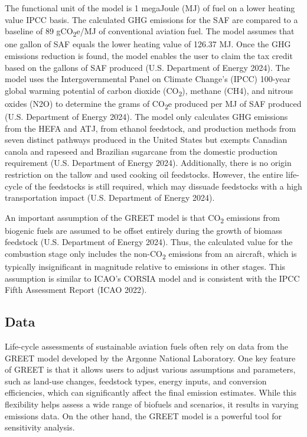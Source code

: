 \documentclass[12pt]{article}
\begin{document}
The functional unit of the model is 1 megaJoule (MJ) of fuel on a lower heating value IPCC basis. The calculated GHG emissions for the SAF are compared to a baseline of 89 gCO\textsubscript{2}e/MJ of conventional aviation fuel. The model assumes that one gallon of SAF equals the lower heating value of 126.37 MJ. Once the GHG emissions reduction is found, the model enables the user to claim the tax credit based on the gallons of SAF produced (U.S. Department of Energy 2024). The model uses the Intergovernmental Panel on Climate Change’s (IPCC) 100-year global warming potential of carbon dioxide (CO\textsubscript{2}), methane (CH4), and nitrous oxides (N2O) to determine the grams of CO\textsubscript{2}e produced per MJ of SAF produced (U.S. Department of Energy 2024). The model only calculates GHG emissions from the HEFA and ATJ, from ethanol feedstock, and production methods from seven distinct pathways produced in the United States but exempts Canadian canola and rapeseed and Brazilian sugarcane from the domestic production requirement (U.S. Department of Energy 2024). Additionally, there is no origin restriction on the tallow and used cooking oil feedstocks. However, the entire life-cycle of the feedstocks is still required, which may dissuade feedstocks with a high transportation impact (U.S. Department of Energy 2024). 

An important assumption of the GREET model is that CO\textsubscript{2} emissions from biogenic fuels are assumed to be offset entirely during the growth of biomass feedstock (U.S. Department of Energy 2024). Thus, the calculated value for the combustion stage only includes the non-CO\textsubscript{2} emissions from an aircraft, which is typically insignificant in magnitude relative to emissions in other stages. This assumption is similar to ICAO’s CORSIA model and is consistent with the IPCC Fifth Assessment Report (ICAO 2022). 

\subsection{Data}

Life-cycle assessments of sustainable aviation fuels often rely on data from the GREET model developed by the Argonne National Laboratory. One key feature of GREET is that it allows users to adjust various assumptions and parameters, such as land-use changes, feedstock types, energy inputs, and conversion efficiencies, which can significantly affect the final emission estimates. While this flexibility helps assess a wide range of biofuels and scenarios, it results in varying emissions data. On the other hand, the GREET model is a powerful tool for sensitivity analysis. 
\end{document}
